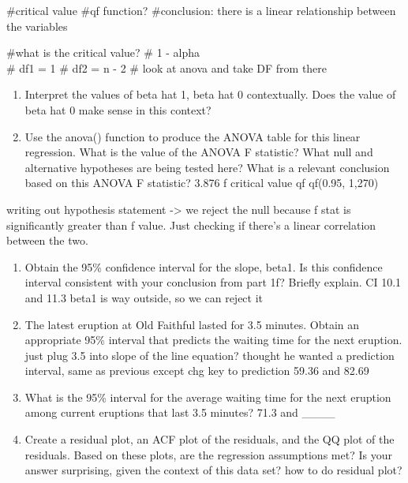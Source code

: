 \documentclass[
]{article}
\begin{document}
\#critical value \#qf function? \#conclusion: there is a linear
relationship between the variables

\#what is the critical value? \# 1 - alpha\\
\# df1 = 1 \# df2 = n - 2 \# look at anova and take DF from there

\begin{enumerate}
\def\labelenumi{(\alph{enumi})}
\setcounter{enumi}{4}
\item
  Interpret the values of beta hat 1, beta hat 0 contextually. Does the
  value of beta hat 0 make sense in this context?
\item
  Use the anova() function to produce the ANOVA table for this linear
  regression. What is the value of the ANOVA F statistic? What null and
  alternative hypotheses are being tested here? What is a relevant
  conclusion based on this ANOVA F statistic? 3.876 f critical value qf
  qf(0.95, 1,270)
\end{enumerate}

writing out hypothesis statement -\textgreater{} we reject the null
because f stat is significantly greater than f value. Just checking if
there's a linear correlation between the two.

\begin{enumerate}
\def\labelenumi{(\alph{enumi})}
\setcounter{enumi}{6}
\item
  Obtain the 95\% confidence interval for the slope, beta1. Is this
  confidence interval consistent with your conclusion from part 1f?
  Briefly explain. CI 10.1 and 11.3 beta1 is way outside, so we can
  reject it
\item
  The latest eruption at Old Faithful lasted for 3.5 minutes. Obtain an
  appropriate 95\% interval that predicts the waiting time for the next
  eruption. just plug 3.5 into slope of the line equation? thought he
  wanted a prediction interval, same as previous except chg key to
  prediction 59.36 and 82.69
\item
  What is the 95\% interval for the average waiting time for the next
  eruption among current eruptions that last 3.5 minutes? 71.3 and
  \_\_\_\_
\item
  Create a residual plot, an ACF plot of the residuals, and the QQ plot
  of the residuals. Based on these plots, are the regression assumptions
  met? Is your answer surprising, given the context of this data set?
  how to do residual plot?
\end{enumerate}
\end{document}
